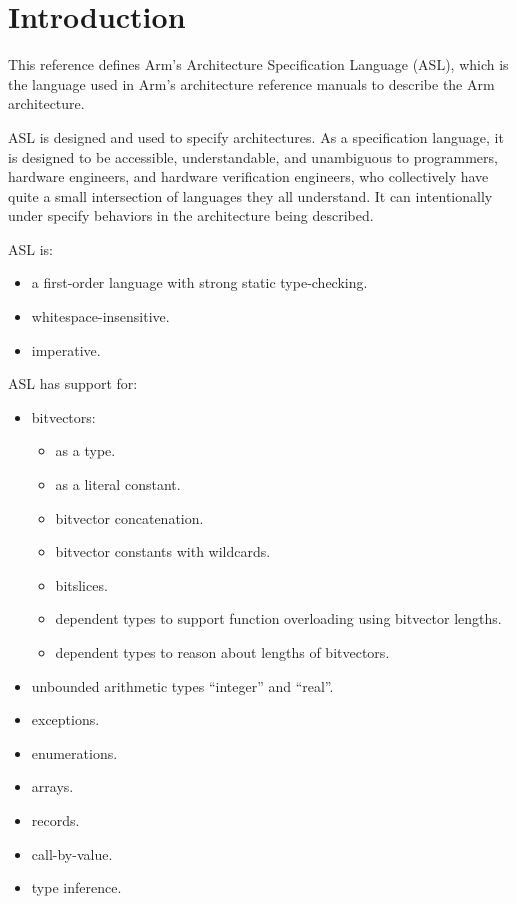 \chapter{Introduction\label{chap:Introduction}}

This reference defines Arm’s Architecture Specification Language (ASL), which is the language
used in Arm’s architecture reference manuals to describe the Arm architecture.

ASL is designed and used to specify architectures. As a specification language, it is designed to be accessible,
understandable, and unambiguous to programmers, hardware
engineers, and hardware verification engineers, who collectively have quite a small intersection of languages they
all understand. It can intentionally under specify behaviors in the architecture being described.

ASL is:
\begin{itemize}
    \item a first-order language with strong static type-checking.
    \item whitespace-insensitive.
    \item imperative.
\end{itemize}

ASL has support for:
\begin{itemize}
    \item bitvectors:
    \begin{itemize}
        \item as a type.
        \item as a literal constant.
        \item bitvector concatenation.
        \item bitvector constants with wildcards.
        \item bitslices.
        \item dependent types to support function overloading using bitvector lengths.
        \item dependent types to reason about lengths of bitvectors.
    \end{itemize}
    \item unbounded arithmetic types “integer” and “real”.
    \item exceptions.
    \item enumerations.
    \item arrays.
    \item records.
    \item call-by-value.
    \item type inference.
\end{itemize}

